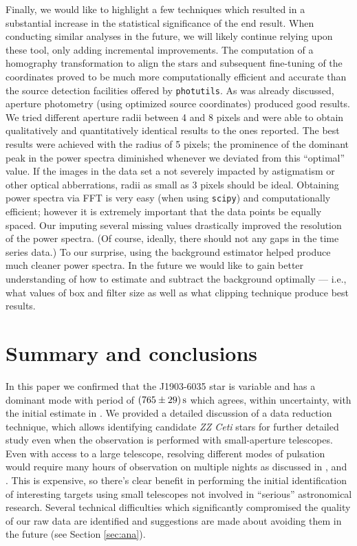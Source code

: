\documentclass{aastex631}
\begin{document}
Finally, we would like to highlight a few techniques which resulted in
a substantial increase in the statistical significance of the end
result. When conducting similar analyses in the future, we will likely
continue relying upon these tool, only adding incremental
improvements. The computation of a homography transformation to align
the stars and subsequent fine-tuning of the coordinates proved to be
much more computationally efficient and accurate than the source
detection facilities offered by \texttt{photutils}. As was already
discussed, aperture photometry (using optimized source coordinates)
produced good results. We tried different aperture radii between 4 and
8 pixels and were able to obtain qualitatively and quantitatively
identical results to the ones reported. The best results were achieved
with the radius of 5 pixels; the prominence of the dominant peak in
the power spectra diminished whenever we deviated from this
``optimal'' value. If the images in the data set a not severely
impacted by astigmatism or other optical abberrations, radii as small
as 3 pixels should be ideal. Obtaining power spectra via FFT is very
easy (when using \texttt{scipy}) and computationally efficient;
however it is extremely important that the data points be equally
spaced. Our imputing several missing values drastically improved the
resolution of the power spectra. (Of course, ideally, there should not
any gaps in the time series data.) To our surprise, using the
background estimator helped produce much cleaner power spectra. In the
future we would like to gain better understanding of how to estimate
and subtract the background optimally --- i.e., what values of box and
filter size as well as what clipping technique produce best results.

\section{Summary and conclusions}
In this paper we confirmed that the J1903-6035 star is variable and
has a dominant mode with period of $\SI{765\pm 29}{\second}$ which
agrees, within uncertainty, with the initial estimate in
\citet{Vincent_2020}. We provided a detailed discussion of a data
reduction technique, which allows identifying candidate \emph{ZZ Ceti}
stars for further detailed study even when the observation is
performed with small-aperture telescopes. Even with access to a large
telescope, resolving different modes of pulsation would require many
hours of observation on multiple nights as discussed in
\citet{Winget_2008}, \citet{Kepler_1989} and
\citet{Bergeron_1990}. This is expensive, so there's clear benefit in
performing the initial identification of interesting targets using
small telescopes not involved in ``serious'' astronomical
research. Several technical difficulties which significantly
compromised the quality of our raw data are identified and suggestions
are made about avoiding them in the future (see Section
\ref{sec:ana}).
\end{document}
